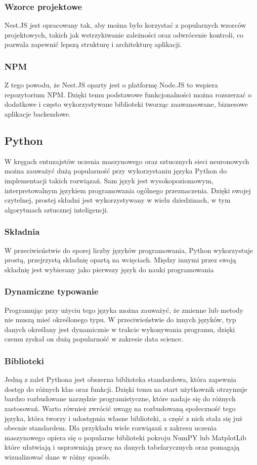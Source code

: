 \subsubsection{Wzorce projektowe}
Nest.JS jest opracowany tak, aby można było korzystać z popularnych wzorców projektowych, takich jak wstrzykiwanie zależności oraz odwrócenie kontroli, co pozwala zapewnić lepszą strukturę i architekturę aplikacji.

\subsubsection{NPM}
Z tego powodu, że Nest.JS oparty jest o platformę Node.JS to wspiera repozytorium NPM. Dzięki temu podstawowe funkcjonalności można rozszerzać o dodatkowe i często wykorzystywane biblioteki tworząc zaawansowane, biznesowe aplikacje backendowe.
\subsection{Python}
W kręgach entuzajstów uczenia maszynowego oraz sztucznych sieci neuronowych można zauważyć dużą popularność przy wykorzystaniu języka Python do implementacji takich rozwiązań. Sam język jest wysokopoziomowym, interpretowalnym językiem programowania ogólnego przeznaczenia. Dzięki swojej czytelnej, prostej składni jest wykorzystywany w wielu dziedzinach, w tym algorytmach sztucznej inteligencji.

\subsubsection{Składnia}
W przeciwieństwie do sporej liczby języków programowania, Python wykorzystuje prostą, przejrzystą składnię opartą na wcięciach. Między innymi przez swoją składnię jest wybierany jako pierwszy język do nauki programowania

\subsubsection{Dynamiczne typowanie}
Programując przy użyciu tego języka można zauważyć, że zmienne lub metody nie muszą mieć określonego typu. W przeciwieństwie do innych języków, typ danych określany jest dynamicznie w trakcie wykonywania programu, dzięki czemu zyskał on dużą popularność w zakresie data science.

\subsubsection{Biblioteki}
Jedną z zalet Pythona jest obszerna biblioteka standardowa, która zapewnia dostęp do różnych klas oraz funkcji. Dzięki temu na start użytkownik otrzymuje bardzo rozbudowane narzędzie programistyczne, które nadaje się do różnych zastosowań. Warto również zwrócić uwagę na rozbudowaną społeczność tego języka, która tworzy i udostępnia własne biblioteki, a część z nich stała się już obecnie standardem. Dla przykładu wiele rozwiązań z zakresu uczenia maszynowego opiera się o popularne biblioteki pokroju NumPY lub MatplotLib które ułatwiają i usprawniają pracę na danych tabelarycznych oraz pomagają wizualizować dane w różny sposób.

